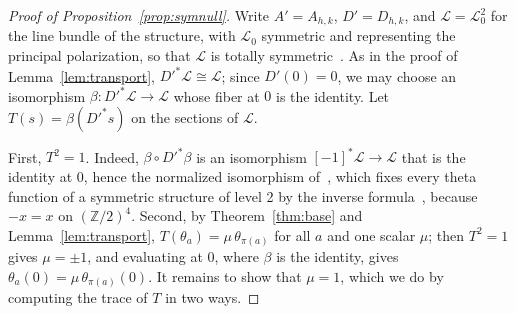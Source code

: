 \documentclass[version=preprint]{iacrcc}
\begin{document}
    \begin{proof}[Proof of Proposition~\ref{prop:symnull}]
        Write $A' = A_{h,k}$, $D' = D_{h,k}$, and $\mathcal L = \mathcal L_0^2$ for
        the line bundle of the structure, with $\mathcal L_0$ symmetric and
        representing the principal polarization, so that $\mathcal L$ is totally
        symmetric~\cite[p.~307]{Mum66}. As in the proof of
        Lemma~\ref{lem:transport}, $D'^*\mathcal L \cong \mathcal L$; since $D'(0)
        = 0$, we may choose an isomorphism $\beta \colon D'^* \mathcal L \to
        \mathcal L$ whose fiber at $0$ is the identity. Let $T(s) = \beta(D'^*
        s)$ on the sections of $\mathcal L$.

        First, $T^2 = 1$. Indeed, $\beta \circ D'^*\beta$ is an isomorphism
        $[-1]^*\mathcal L \to \mathcal L$ that is the identity at $0$, hence the
        normalized isomorphism of~\cite[p.~304]{Mum66}, which fixes every theta
        function of a symmetric structure of level 2 by the inverse
        formula~\cite[p.~331]{Mum66}, because $-x = x$ on $(\mathbb Z/2)^4$.
        Second, by Theorem~\ref{thm:base} and Lemma~\ref{lem:transport}, $T(\theta_a)
        = \mu\, \theta_{\pi(a)}$ for all $a$ and one scalar $\mu$; then $T^2 = 1$
        gives $\mu = \pm 1$, and evaluating at $0$, where $\beta$ is the identity,
        gives $\theta_a(0) = \mu\, \theta_{\pi(a)}(0)$. It remains to show that
        $\mu = 1$, which we do by computing the trace of $T$ in two ways.


\end{proof}
\end{document}
